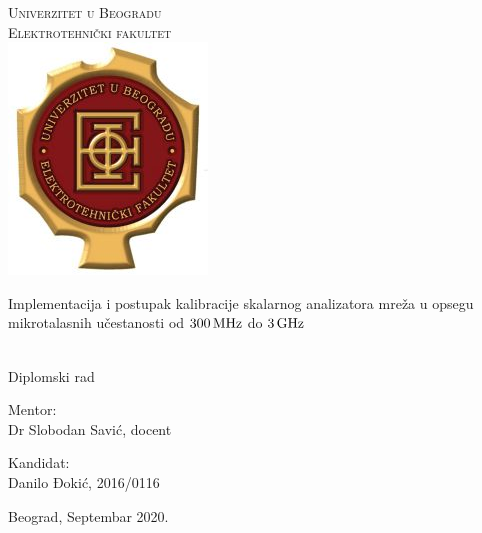 \documentclass[a4paper, 12pt, diplomski]{etf}
\renewcommand{\unit}[1]{\,{\rm #1}}   %
\begin{document}


\begin{center}
    {
    \Large
    \textsc{Univerzitet u Beogradu} \\
    \textsc{Elektrotehnički fakultet} \\
    \includegraphics[scale=.5]{fig/etf-logo-lat.jpg}
    
    \vfill
    
    \LARGE
    Implementacija i postupak kalibracije skalarnog
    analizatora mreža u opsegu mikrotalasnih učestanosti
    od $300\unit{MHz}$ do $3\unit{GHz}$
    } \\[2mm]
    {\large Diplomski rad}
    
    \vfill
    
    \large 
    
    \begin{minipage}{.49\textwidth}
    Mentor:     \\
    Dr Slobodan Savić, docent
    \end{minipage}
    \begin{minipage}{.49\textwidth}
    \begin{flushright}
    Kandidat: \\
    Danilo Đokić, 2016/0116
    \end{flushright}
    \end{minipage}

    
    \vfill
    
    Beograd, Septembar 2020.
\end{center}

\thispagestyle{empty}

\newpage

\tableofcontents
\end{document}
